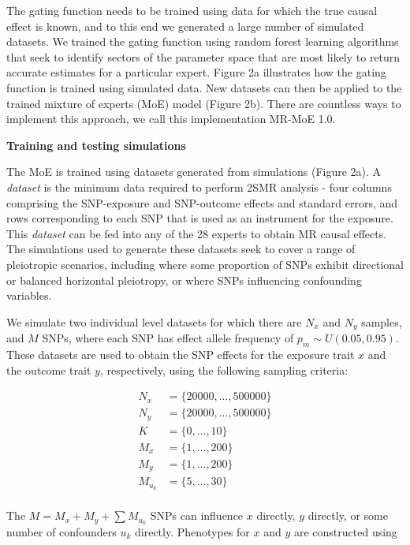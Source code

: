 \documentclass[]{article}
\begin{document}
The gating function needs to be trained using data for which the true
causal effect is known, and to this end we generated a large number of
simulated datasets. We trained the gating function using random forest
learning algorithms that seek to identify sectors of the parameter space
that are most likely to return accurate estimates for a particular
expert. Figure 2a illustrates how the gating function is trained using
simulated data. New datasets can then be applied to the trained mixture
of experts (MoE) model (Figure 2b). There are countless ways to
implement this approach, we call this implementation MR-MoE 1.0.

\textbf{Training and testing simulations}

The MoE is trained using datasets generated from simulations (Figure
2a). A \emph{dataset} is the minimum data required to perform 2SMR
analysis - four columns comprising the SNP-exposure and SNP-outcome
effects and standard errors, and rows corresponding to each SNP that is
used as an instrument for the exposure. This \emph{dataset} can be fed
into any of the 28 experts to obtain MR causal effects. The simulations
used to generate these datasets seek to cover a range of pleiotropic
scenarios, including where some proportion of SNPs exhibit directional
or balanced horizontal pleiotropy, or where SNPs influencing confounding
variables.

We simulate two individual level datasets for which there are \(N_x\)
and \(N_y\) samples, and \(M\) SNPs, where each SNP has effect allele
frequency of \(p_m \sim U(0.05, 0.95)\). These datasets are used to
obtain the SNP effects for the exposure trait \(x\) and the outcome
trait \(y\), respectively, using the following sampling criteria:

\[
\begin{aligned}
N_x & = \{20000, ..., 500000\} \\
N_y & = \{20000, ..., 500000\} \\
K & = \{0, ..., 10\} \\
M_x & = \{1, ..., 200\} \\
M_y & = \{1, ..., 200\} \\
M_{u_k} & = \{5,..., 30\} \\
\end{aligned}
\]

The \(M = M_x + M_y + \sum{M_{u_k}}\) SNPs can influence \(x\) directly,
\(y\) directly, or some number of confounders \(u_{k}\) directly.
Phenotypes for \(x\) and \(y\) are constructed using
\end{document}
